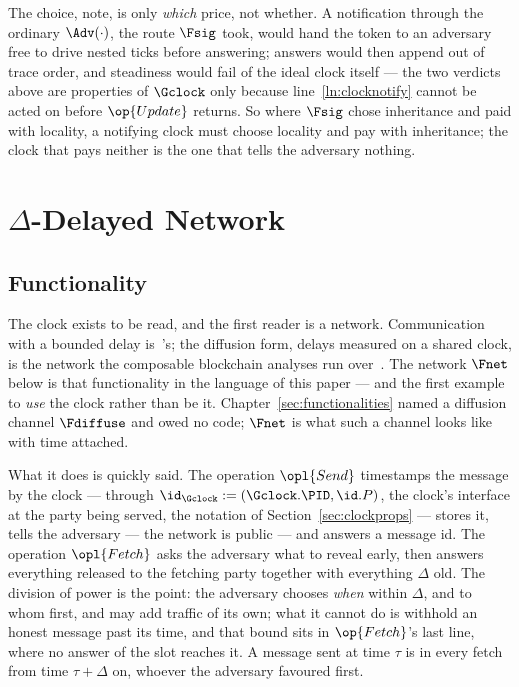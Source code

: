 \documentclass[10pt,oneside,openany]{book}
\makeatletter
\newcommand{\nav@headtext}{}
\newcommand{\nav@setheadtext}[1]{%
  \gdef\nav@headtext{%
    \ifnum\c@secnumdepth>\m@ne
      \if@mainmatter \@chapapp\ \thechapter.\ \fi
    \fi #1}}
\newcommand{\chapterhead}[1]{\nav@setheadtext{#1}}
\theoremstyle{accentdef}
\theoremstyle{accentplain}
\makeatother
\begin{document}
The choice, note, is only \emph{which} price, not whether. A notification through the ordinary
$\Adv(\cdot)$, the route $\Fsig$ took, would hand the token to an adversary free to drive nested
ticks before answering; answers would then append out of trace order, and steadiness would fail
of the ideal clock itself --- the two verdicts above are properties of $\Gclock$ only because
line~\ref{ln:clocknotify} cannot be acted on before $\op{Update}$ returns. So where $\Fsig$ chose
inheritance and paid with locality, a notifying clock must choose locality and pay with
inheritance; the clock that pays neither is the one that tells the adversary nothing.

\chapter{\texorpdfstring{$\Delta$}{Δ}-Delayed Network}\label{sec:fnet}
\chapterhead{Delta-Delayed Network}

\section{Functionality}\label{sec:fnetfunc}

The clock exists to be read, and the first reader is a network. Communication with a bounded
delay is~\cite{KMTZ13}'s; the diffusion form, delays measured on a shared clock, is the network
the composable blockchain analyses run over~\cite{BMTZ17}. The network $\Fnet$ below is that functionality
in the language of this paper --- and the first example to \emph{use} the clock rather than be
it. Chapter~\ref{sec:functionalities} named a diffusion channel $\Fdiffuse$ and owed no code;
$\Fnet$ is what such a channel looks like with time attached.

What it does is quickly said. The operation $\opl{Send}$ timestamps the message by the clock --- through
$\id_{\Gclock} := (\Gclock.\PID,\id.P)$, the clock's interface at the party being served, the
notation of Section~\ref{sec:clockprops} --- stores it, tells the adversary --- the network is
public --- and answers a message id. The operation $\opl{Fetch}$ asks the
adversary what to reveal early, then answers everything released to the fetching party together
with everything $\Delta$ old. The division of power is the point: the adversary chooses
\emph{when} within $\Delta$, and to whom first, and may add traffic of its own; what it cannot do
is withhold an honest message past its time, and that bound sits in $\op{Fetch}$'s last line,
where no answer of the slot reaches it. A message sent at time $\tau$ is in every fetch from
time $\tau + \Delta$ on, whoever the adversary favoured first.
\end{document}

